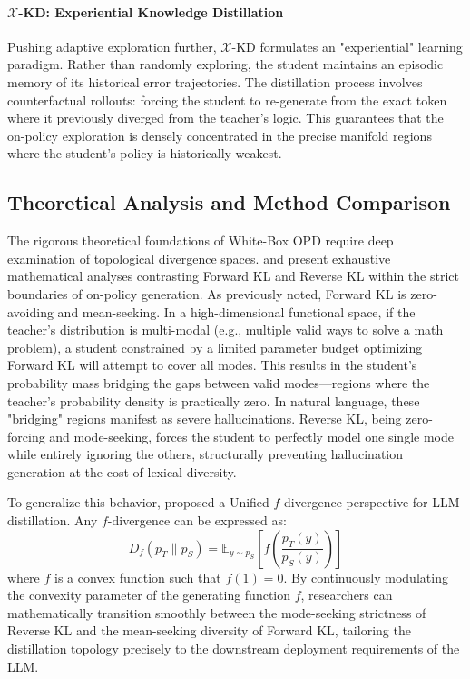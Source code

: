 \documentclass{article} %
\begin{document}
\paragraph{$\mathcal{X}$-KD: Experiential Knowledge Distillation}
Pushing adaptive exploration further, $\mathcal{X}$-KD \citep{2602.12674} formulates an "experiential" learning paradigm. Rather than randomly exploring, the student maintains an episodic memory of its historical error trajectories. The distillation process involves counterfactual rollouts: forcing the student to re-generate from the exact token where it previously diverged from the teacher's logic. This guarantees that the on-policy exploration is densely concentrated in the precise manifold regions where the student's policy is historically weakest.

\subsection{Theoretical Analysis and Method Comparison}
\label{subsec:theory_whitebox}

The rigorous theoretical foundations of White-Box OPD require deep examination of topological divergence spaces. \citet{2404.02657} and \citet{2402.11890} present exhaustive mathematical analyses contrasting Forward KL and Reverse KL within the strict boundaries of on-policy generation. As previously noted, Forward KL is zero-avoiding and mean-seeking. In a high-dimensional functional space, if the teacher's distribution is multi-modal (e.g., multiple valid ways to solve a math problem), a student constrained by a limited parameter budget optimizing Forward KL will attempt to cover all modes. This results in the student's probability mass bridging the gaps between valid modes—regions where the teacher's probability density is practically zero. In natural language, these "bridging" regions manifest as severe hallucinations. Reverse KL, being zero-forcing and mode-seeking, forces the student to perfectly model one single mode while entirely ignoring the others, structurally preventing hallucination generation at the cost of lexical diversity.

To generalize this behavior, \citet{2307.15190} proposed a Unified $f$-divergence perspective for LLM distillation. Any $f$-divergence can be expressed as:
\begin{equation}
    D_f(p_T \parallel p_S) = \mathbb{E}_{y \sim p_S} \left[ f \left( \frac{p_T(y)}{p_S(y)} \right) \right]
\end{equation}
where $f$ is a convex function such that $f(1)=0$. By continuously modulating the convexity parameter of the generating function $f$, researchers can mathematically transition smoothly between the mode-seeking strictness of Reverse KL and the mean-seeking diversity of Forward KL, tailoring the distillation topology precisely to the downstream deployment requirements of the LLM.
\end{document}
